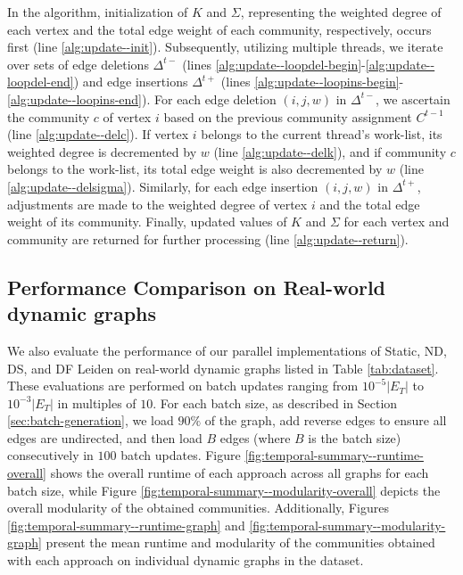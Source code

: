 In the algorithm, initialization of $K$ and $\Sigma$, representing the weighted degree of each vertex and the total edge weight of each community, respectively, occurs first (line \ref{alg:update--init}). Subsequently, utilizing multiple threads, we iterate over sets of edge deletions $\Delta^{t-}$ (lines \ref{alg:update--loopdel-begin}-\ref{alg:update--loopdel-end}) and edge insertions $\Delta^{t+}$ (lines \ref{alg:update--loopins-begin}-\ref{alg:update--loopins-end}). For each edge deletion $(i, j, w)$ in $\Delta^{t-}$, we ascertain the community $c$ of vertex $i$ based on the previous community assignment $C^{t-1}$ (line \ref{alg:update--delc}). If vertex $i$ belongs to the current thread's work-list, its weighted degree is decremented by $w$ (line \ref{alg:update--delk}), and if community $c$ belongs to the work-list, its total edge weight is also decremented by $w$ (line \ref{alg:update--delsigma}). Similarly, for each edge insertion $(i, j, w)$ in $\Delta^{t+}$, adjustments are made to the weighted degree of vertex $i$ and the total edge weight of its community. Finally, updated values of $K$ and $\Sigma$ for each vertex and community are returned for further processing (line \ref{alg:update--return}).






\subsection{Performance Comparison on Real-world dynamic graphs}
\label{sec:performance-comparison-temporal}

We also evaluate the performance of our parallel implementations of Static, ND, DS, and DF Leiden on real-world dynamic graphs listed in Table \ref{tab:dataset}. These evaluations are performed on batch updates ranging from $10^{-5}|E_T|$ to $10^{-3}|E_T|$ in multiples of $10$. For each batch size, as described in Section \ref{sec:batch-generation}, we load $90\%$ of the graph, add reverse edges to ensure all edges are undirected, and then load $B$ edges (where $B$ is the batch size) consecutively in $100$ batch updates. Figure \ref{fig:temporal-summary--runtime-overall} shows the overall runtime of each approach across all graphs for each batch size, while Figure \ref{fig:temporal-summary--modularity-overall} depicts the overall modularity of the obtained communities. Additionally, Figures \ref{fig:temporal-summary--runtime-graph} and \ref{fig:temporal-summary--modularity-graph} present the mean runtime and modularity of the communities obtained with each approach on individual dynamic graphs in the dataset.

